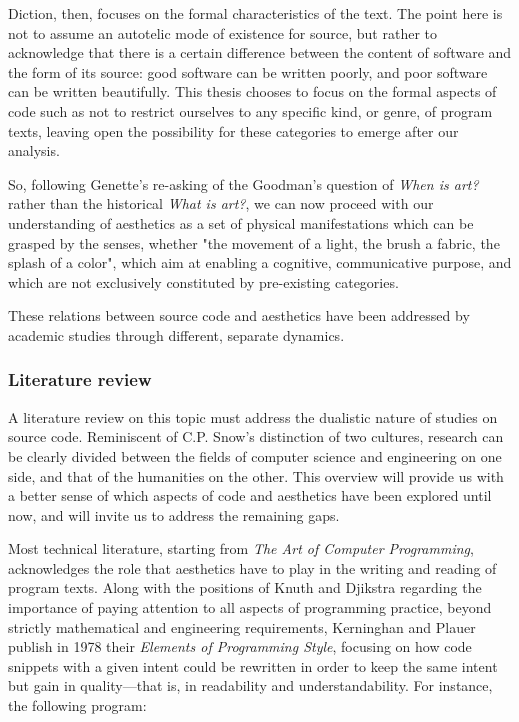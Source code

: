 Diction, then, focuses on the formal characteristics of the text. The point here is not to assume an autotelic mode of existence for source, but rather to acknowledge that there is a certain difference between the content of software and the form of its source: good software can be written poorly, and poor software can be written beautifully. This thesis chooses to focus on the formal aspects of code such as not to restrict ourselves to any specific kind, or genre, of program texts, leaving open the possibility for these categories to emerge after our analysis.

So, following Genette's re-asking of the Goodman's question of \emph{When is art?} rather than the historical \emph{What is art?}, we can now proceed with our understanding of aesthetics as a set of physical manifestations which can be grasped by the senses, whether "the movement of a light, the brush a fabric, the splash of a color"\cite{ranciere_aisthesis_2013}, which aim at enabling a cognitive, communicative purpose, and which are not exclusively constituted by pre-existing categories.

These relations between source code and aesthetics have been addressed by academic studies through different, separate dynamics.

\subsubsection{Literature review}


A literature review on this topic must address the dualistic nature of studies on source code. Reminiscent of C.P. Snow's distinction of two cultures, research can be clearly divided between the fields of computer science and engineering on one side, and that of the humanities on the other. This overview will provide us with a better sense of which aspects of code and aesthetics have been explored until now, and will invite us to address the remaining gaps.

Most technical literature, starting from \emph{The Art of Computer Programming}, acknowledges the role that aesthetics have to play in the writing and reading of program texts. Along with the positions of Knuth and Djikstra regarding the importance of paying attention to all aspects of programming practice, beyond strictly mathematical and engineering requirements, Kerninghan and Plauer publish in 1978 their \emph{Elements of Programming Style}\cite{kernighan_elements_1978}, focusing on how code snippets with a given intent could be rewritten in order to keep the same intent but gain in quality—that is, in readability and understandability. For instance, the following program:

